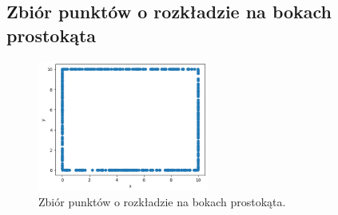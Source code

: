 \documentclass{lab}
\begin{document}
\subsection{Zbiór punktów o rozkładzie na bokach prostokąta}

\begin{figure}[H]
  \centering
  \includegraphics[width=0.5\textwidth]{resources/rectangle.png}
  \caption{Zbiór punktów o rozkładzie na bokach prostokąta.}
  \label{fig:rectangle}
\end{figure}
\end{document}
